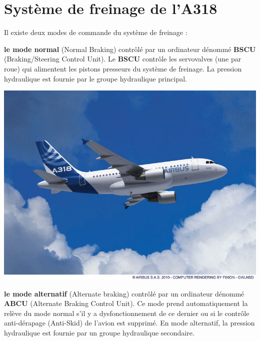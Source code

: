 \section{Système de freinage de l'A318}


Il existe deux modes de commande du système de freinage :
\begin{itemize}
\begin{minipage}{0.6\linewidth}
 \item \textbf{le mode normal} (Normal Braking) contrôlé par un ordinateur dénommé \textbf{BSCU} (Braking/Steering Control Unit). Le \textbf{BSCU} contrôle les servovalves (une par roue) qui alimentent les pistons presseurs du système de freinage. La pression hydraulique est fournie par le groupe hydraulique principal.
\end{minipage}
\hfill
\begin{minipage}{0.38\linewidth}
 \centering\includegraphics[width=0.7\linewidth]{img/A318.jpg}
 \vspace{0.5cm}
\end{minipage}
 \item \textbf{le mode alternatif} (Alternate braking) contrôlé par un ordinateur dénommé \textbf{ABCU} (Alternate Braking Control Unit). Ce mode prend automatiquement la relève du mode normal s'il y a dysfonctionnement de ce dernier ou si le contrôle anti-dérapage (Anti-Skid) de l'avion est supprimé. En mode alternatif, la pression hydraulique est fournie par un groupe hydraulique secondaire.
\end{itemize}

